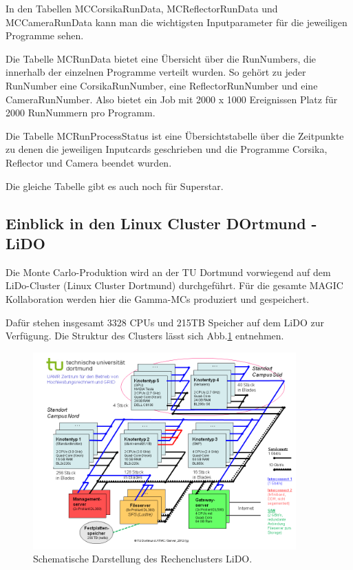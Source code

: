 In den Tabellen MCCorsikaRunData, MCReflectorRunData und MCCameraRunData kann man die wichtigsten Inputparameter für die jeweiligen Programme sehen.

Die Tabelle MCRunData bietet eine Übersicht über die RunNumbers, die innerhalb der einzelnen Programme verteilt wurden. 
So gehört zu jeder RunNumber eine CorsikaRunNumber, eine ReflectorRunNumber und eine CameraRunNumber.
Also bietet ein Job mit 2000 x 1000 Ereignissen Platz für 2000 RunNummern pro Programm.

Die Tabelle MCRunProcessStatus ist eine Übersichtstabelle über die Zeitpunkte zu denen die jeweiligen Inputcards geschrieben und die Programme Corsika, Reflector und Camera beendet wurden.

Die gleiche Tabelle gibt es auch noch für Superstar. 


\subsection{Einblick in den Linux Cluster DOrtmund - LiDO}
Die Monte Carlo-Produktion wird an der TU Dortmund vorwiegend auf dem LiDo-Cluster (Linux Cluster Dortmund) durchgeführt. 
Für die gesamte MAGIC Kollaboration werden hier die Gamma-MCs produziert und gespeichert.

Dafür stehen insgesamt 3328 CPUs und 215TB Speicher auf dem LiDO zur Verfügung.
Die Struktur des Clusters lässt sich Abb.\ref{LiDo} entnehmen.

\begin{figure}[!h]
    \centering
    \includegraphics[width=0.9\textwidth]{./Plots/03_MonteCarlos/LiDO.png}
    \caption{Schematische Darstellung des Rechenclusters LiDO.\cite{LiDO}}
    \label{LiDo}
\end{figure}


